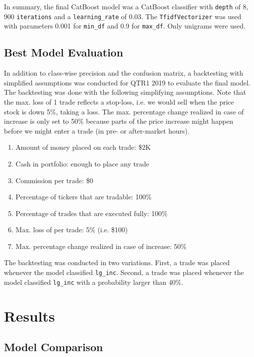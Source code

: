 \documentclass{article}
\begin{document}
	In summary, the final CatBoost model was a CatBoost classifier with \lstinline{depth} of 8, 900 \lstinline{iterations} and a \lstinline{learning_rate} of 0.03. The \lstinline{TfidfVectorizer} was used with parameters 0.001 for \lstinline{min_df} and 0.9 for \lstinline{max_df}. Only unigrams were used.
	

	\subsection{Best Model Evaluation}
	
	In addition to class-wise precision and the confusion matrix, a backtesting with simplified assumptions was conducted for QTR1 2019 to evaluate the final model. The backtesting was done with the following simplifying assumptions. Note that the max. loss of 1 trade reflects a stop-loss, i.e. we would sell when the price stock is down 5\%, taking a loss. The max. percentage change realized in case of increase is only set to 50\% because parts of the price increase might happen before we might enter a trade (in pre- or after-market hours).
	
	\begin{enumerate}
		\item 	Amount of money placed on each trade: \$2K
		\item 	Cash in portfolio: enough to place any trade
		\item 	Commission per trade: \$0
		\item 	Percentage of tickers that are tradable: 100\%
		\item 	Percentage of trades that are executed fully: 100\%
		\item 	Max. loss of per trade: 5\% (i.e. \$100)
		\item 	Max. percentage change realized in case of increase: 50\%
	\end{enumerate}
	
	The backtesting was conducted in two variations. First, a trade was placed whenever the model classified \lstinline{lg_inc}. Second, a trade was placed whenever the model classified \lstinline{lg_inc} with a probability larger than 40\%.
	
	\section{Results}
	
	\subsection{Model Comparison}
\end{document}
